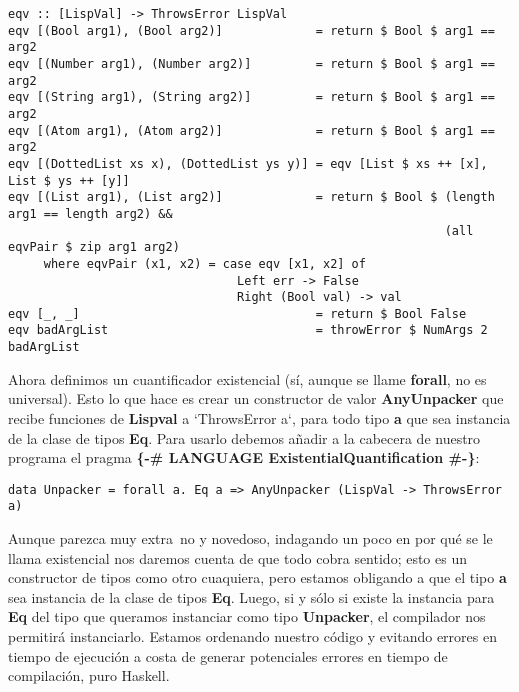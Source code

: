\begin{minipage}{\linewidth}
\begin{tiny}
\begin{lstlisting}[frame=single]
eqv :: [LispVal] -> ThrowsError LispVal
eqv [(Bool arg1), (Bool arg2)]             = return $ Bool $ arg1 == arg2
eqv [(Number arg1), (Number arg2)]         = return $ Bool $ arg1 == arg2
eqv [(String arg1), (String arg2)]         = return $ Bool $ arg1 == arg2
eqv [(Atom arg1), (Atom arg2)]             = return $ Bool $ arg1 == arg2
eqv [(DottedList xs x), (DottedList ys y)] = eqv [List $ xs ++ [x], List $ ys ++ [y]]
eqv [(List arg1), (List arg2)]             = return $ Bool $ (length arg1 == length arg2) && 
                                                             (all eqvPair $ zip arg1 arg2)
     where eqvPair (x1, x2) = case eqv [x1, x2] of
                                Left err -> False
                                Right (Bool val) -> val
eqv [_, _]                                 = return $ Bool False
eqv badArgList                             = throwError $ NumArgs 2 badArgList
\end{lstlisting}
\end{tiny}
\end{minipage}

Ahora definimos un cuantificador existencial (s\'i, aunque se llame \textbf{forall}, no es universal). Esto lo que hace es crear un constructor de valor \textbf{AnyUnpacker} que recibe funciones de \textbf{Lispval} a `ThrowsError a`, para todo tipo \textbf{a} que sea instancia de la clase de tipos \textbf{Eq}. Para usarlo debemos a\~nadir a la cabecera de nuestro programa el pragma \textbf{\{-\# LANGUAGE ExistentialQuantification \#-\}}:\\

\begin{minipage}{\linewidth}
\begin{scriptsize}
\begin{lstlisting}[frame=single]
data Unpacker = forall a. Eq a => AnyUnpacker (LispVal -> ThrowsError a)
\end{lstlisting}
\end{scriptsize}
\end{minipage}

Aunque parezca muy extra~no y novedoso, indagando un poco en por qu\'e se le llama existencial nos daremos cuenta de que todo cobra sentido; esto es un constructor de tipos como otro cuaquiera, pero estamos obligando a que el tipo \textbf{a} sea instancia de la clase de tipos \textbf{Eq}. Luego, si y s\'olo si existe la instancia para \textbf{Eq} del tipo que queramos instanciar como tipo \textbf{Unpacker}, el compilador nos permitir\'a instanciarlo. Estamos ordenando nuestro c\'odigo y evitando errores en tiempo de ejecuci\'on a costa de generar potenciales errores en tiempo de compilaci\'on, puro Haskell.\\

